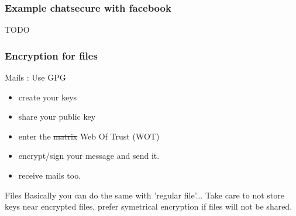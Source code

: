 \begin{frame}
\frametitle{Example chatsecure with facebook}
TODO
\end{frame}
\begin{frame}
\frametitle{Encryption for files}
\begin{block}{Mails : Use GPG}
\begin{itemize}
\item create your keys
\item share your public key
\item enter the \sout{matrix} Web Of Trust (WOT)
\item encrypt/sign your message and send it.
\item receive mails too.
\end{itemize}
\end{block}
\begin{block}{Files}
Basically you can do the same with 'regular file'...
Take care to not store keys near encrypted files, prefer symetrical encryption
if files will not be shared.
\end{block}
\end{frame}

